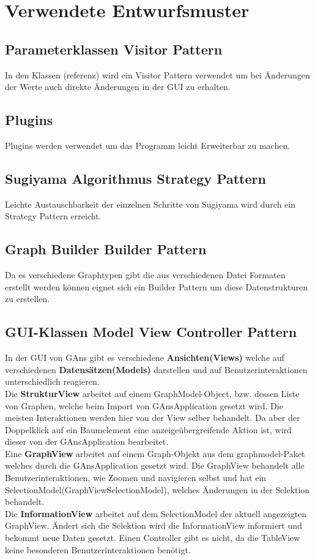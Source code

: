\chapter{Verwendete Entwurfsmuster}
\label{ch:entwurfsmuster}

\section{Parameterklassen Visitor Pattern}
In den Klassen (referenz) wird ein Visitor Pattern verwendet um bei Änderungen der Werte auch direkte Änderungen in der GUI zu erhalten. %

\section{Plugins}
Plugins werden verwendet um das Programm leicht Erweiterbar zu machen.

\section{Sugiyama Algorithmus Strategy Pattern}
Leichte Austauschbarkeit der einzelnen Schritte von Sugiyama wird durch ein Strategy Pattern erreicht.

\section{Graph Builder Builder Pattern}
Da es verschiedene Graphtypen gibt die aus verschiedenen Datei Formaten erstellt werden können eignet sich ein Builder Pattern um diese Datenstrukturen zu erstellen.

\section{GUI-Klassen Model View Controller Pattern}
In der GUI von GAns gibt es verschiedene \textbf{Ansichten(Views)} welche auf verschiedenen \textbf{Datensätzen(Models)} darstellen und auf Benutzerinteraktionen unterschiedlich reagieren. \\
Die \textbf{StrukturView} arbeitet auf einem GraphModel-Object, bzw. dessen Liste von Graphen, welche beim Import von GAnsApplication gesetzt wird. Die meisten Interaktionen werden hier von der View selber behandelt. Da aber der Doppelklick auf ein Baumelement eine anzeigeübergreifende Aktion ist, wird dieser von der GAnsApplication bearbeitet. \\
Eine \textbf{GraphView} arbeitet auf einem Graph-Objekt aus dem graphmodel-Paket welches durch die GAnsApplication gesetzt wird. Die GraphView behandelt alle Benutzerinteraktionen, wie Zoomen und navigieren selbst und hat ein SelectionModel(GraphViewSelectionModel), welches Änderungen in der Selektion behandelt. \\
Die \textbf{InformationView} arbeitet auf dem SelectionModel der aktuell angezeigten GraphView. Ändert sich die Selektion wird die InformationView informiert und bekommt neue Daten gesetzt. Einen Controller gibt es nicht, da die TableView keine besonderen Benutzerinteraktionen benötigt.